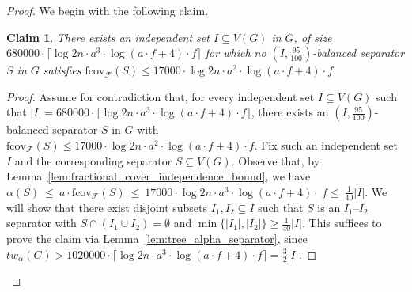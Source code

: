 \documentclass[11pt]{amsart}
\newtheorem{claim}{Claim}[theorem]
\newcommand{\atw}{tw_{\alpha}\xspace}
\begin{document}
\begin{proof}
    We begin with the following claim.
    \begin{claim}\label{claim:balanced_sep_of_I}
        There exists an independent set $I \subseteq V(G)$ in $G$, of size $680000 \cdot \lceil \log 2n \cdot a^3 \cdot {\log(a\cdot f + 4)} \cdot f \rceil$ for which no $(I, \frac{95}{100})$-balanced separator $S$ in $G$ satisfies $\mathrm{fcov}_{\mathcal{F}}(S) \leq 17000 \cdot \log 2n \cdot a^2 \cdot {\log(a\cdot f + 4)} \cdot f$.
    \end{claim}
    \begin{proof}
        Assume for contradiction that, for every independent set $I \subseteq V(G)$ such that $|I| = 680000 \cdot \lceil \log 2n \cdot a^3 \cdot {\log(a\cdot f + 4)} \cdot f \rceil$, there exists an $(I, \frac{95}{100})$-balanced separator $S$ in $G$ with $\mathrm{fcov}_{\mathcal{F}}(S) \leq 17000 \cdot \log 2n \cdot a^2 \cdot {\log(a\cdot f + 4)} \cdot f$. Fix such an independent set $I$ and the corresponding separator $S \subseteq V(G)$. Observe that, by Lemma~\ref{lem:fractional_cover_independence_bound}, we have $\alpha(S)\ \leq\ a \cdot \mathrm{fcov}_{\mathcal{F}}(S)\ \leq\ 17000 \cdot \log 2n \cdot a^3 \cdot {\log(a\cdot f + 4)} \cdot\ f \leq\ \frac{1}{40}|I|$. We will show that there exist disjoint subsets $I_1, I_2 \subseteq I$ such that $S$ is an $I_1$--$I_2$ separator with $S \cap (I_1 \cup I_2) = \emptyset$ and $\min\{|I_1|, |I_2|\} \geq \frac{1}{40} |I|$. This suffices to prove the claim via Lemma~\ref{lem:tree_alpha_separator}, since $\atw(G) > 1020000 \cdot \lceil \log 2n \cdot a^3 \cdot {\log(a\cdot f + 4)} \cdot f \rceil = \frac{3}{2}|I|$.
        

\end{proof}
\end{proof}
\end{document}
